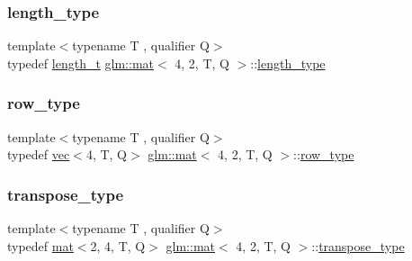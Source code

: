 \mbox{\label{structglm_1_1mat_3_014_00_012_00_01_t_00_01_q_01_4_a4b192a2630331f70ca61657d9783026e}} 
\subsubsection{\texorpdfstring{length\+\_\+type}{length\_type}}
{\footnotesize\ttfamily template$<$typename T , qualifier Q$>$ \\
typedef \hyperlink{namespaceglm_a090a0de2260835bee80e71a702492ed9}{length\+\_\+t} \hyperlink{structglm_1_1mat}{glm\+::mat}$<$ 4, 2, T, Q $>$\+::\hyperlink{structglm_1_1mat_3_014_00_012_00_01_t_00_01_q_01_4_a4b192a2630331f70ca61657d9783026e}{length\+\_\+type}}

\mbox{\label{structglm_1_1mat_3_014_00_012_00_01_t_00_01_q_01_4_a33d6c2074d5507b728a6e2e91a84f6a8}} 
\subsubsection{\texorpdfstring{row\+\_\+type}{row\_type}}
{\footnotesize\ttfamily template$<$typename T , qualifier Q$>$ \\
typedef \hyperlink{structglm_1_1vec}{vec}$<$4, T, Q$>$ \hyperlink{structglm_1_1mat}{glm\+::mat}$<$ 4, 2, T, Q $>$\+::\hyperlink{structglm_1_1mat_3_014_00_012_00_01_t_00_01_q_01_4_a33d6c2074d5507b728a6e2e91a84f6a8}{row\+\_\+type}}

\mbox{\label{structglm_1_1mat_3_014_00_012_00_01_t_00_01_q_01_4_ab74329af13d01d0d1bdac3ea3619fc68}} 
\subsubsection{\texorpdfstring{transpose\+\_\+type}{transpose\_type}}
{\footnotesize\ttfamily template$<$typename T , qualifier Q$>$ \\
typedef \hyperlink{structglm_1_1mat}{mat}$<$2, 4, T, Q$>$ \hyperlink{structglm_1_1mat}{glm\+::mat}$<$ 4, 2, T, Q $>$\+::\hyperlink{structglm_1_1mat_3_014_00_012_00_01_t_00_01_q_01_4_ab74329af13d01d0d1bdac3ea3619fc68}{transpose\+\_\+type}}


